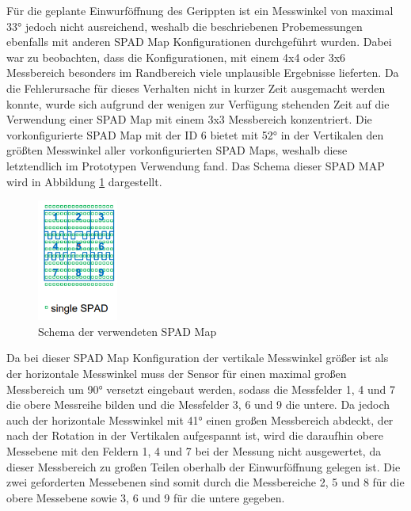         Für die geplante Einwurföffnung des Gerippten ist ein Messwinkel von  maximal 33° jedoch nicht ausreichend, weshalb die beschriebenen Probemessungen ebenfalls mit anderen SPAD Map Konfigurationen durchgeführt wurden. Dabei war zu beobachten, dass die Konfigurationen, mit einem 4x4 oder 3x6 Messbereich besonders im Randbereich viele unplausible Ergebnisse lieferten. Da die Fehlerursache für dieses Verhalten nicht in kurzer Zeit ausgemacht werden konnte, wurde sich aufgrund der wenigen zur Verfügung stehenden Zeit auf die Verwendung einer SPAD Map mit einem 3x3 Messbereich konzentriert. Die vorkonfigurierte SPAD Map mit der ID 6 bietet mit 52° in der Vertikalen den größten Messwinkel aller vorkonfigurierten SPAD Maps, weshalb diese letztendlich im Prototypen Verwendung fand. Das Schema dieser SPAD MAP wird in Abbildung \ref{fig:SPAD-Map_6} dargestellt.\\

        \begin{figure}[H]
            \begin{center}
                \includegraphics[height=4cm]{media/03_technical_implementation/SPAD-Map_6.png}
            \end{center}
            \caption{Schema der verwendeten SPAD Map}
            \label{fig:SPAD-Map_6}
        \end{figure}

        Da bei dieser SPAD Map Konfiguration der vertikale Messwinkel größer ist als der horizontale Messwinkel muss der Sensor für einen maximal großen Messbereich um 90° versetzt eingebaut werden, sodass die Messfelder 1, 4 und 7 die obere Messreihe bilden und die Messfelder 3, 6 und 9 die untere. Da jedoch auch der horizontale Messwinkel mit 41° einen großen Messbereich abdeckt, der nach der Rotation in der Vertikalen aufgespannt ist, wird die daraufhin obere Messebene mit den Feldern 1, 4 und 7 bei der Messung nicht ausgewertet, da dieser Messbereich zu großen Teilen oberhalb der Einwurföffnung gelegen ist. Die zwei geforderten Messebenen sind somit durch die Messbereiche 2, 5 und 8 für die obere Messebene sowie 3, 6 und 9 für die untere gegeben.\\

